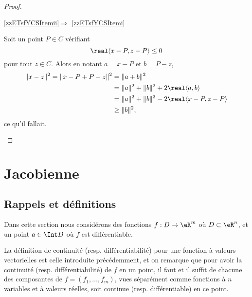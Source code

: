 \begin{proof}
\begin{subproof}
        \item[\ref{zzETsfYCSItemii}\( \Rightarrow\) \ref{zzETsfYCSItemi}]

            Soit un point \( P\in C\) vérifiant 
            \begin{equation}
                \real\langle x-P, z-P\rangle \leq 0
            \end{equation}
            pour tout \( z\in C\). Alors en notant \( a=x-P\) et \( b=P-z\),
            \begin{equation}
                \begin{aligned}[]
                \| x-z \|^2=\| x-P+P-z \|^2&=\| a+b \|^2\\
                &=\| a \|^2+\| b \|^2+2\real\langle a, b\rangle \\
                &=\| a \|^2+\| b \|^2-2\real\langle x-P, z-P\rangle \\
                &\geq \| b \|^2,
                \end{aligned}
            \end{equation}
            ce qu'il fallait.
    \end{subproof}
\end{proof}


\section{Jacobienne}

\subsection{Rappels et définitions}

Dans cette section nous considérons des fonctions $f : D \to \eR^m$
où $D \subset \eR^n$, et un point $a \in \Int D$ où $f$ est
différentiable.
\begin{remark}
  La définition de continuité (resp. différentiabilité) pour une
  fonction à valeurs vectorielles est celle introduite précédemment,
  et on remarque que pour avoir la continuité
  (resp. différentiabilité) de $f$ en un point, il faut et il suffit
  de chacune des composantes de $f = (f_1,\ldots, f_m)$, vues
  séparément comme fonctions à $n$ variables et à valeurs réelles,
  soit continue (resp. différentiable) en ce point.
\end{remark}


